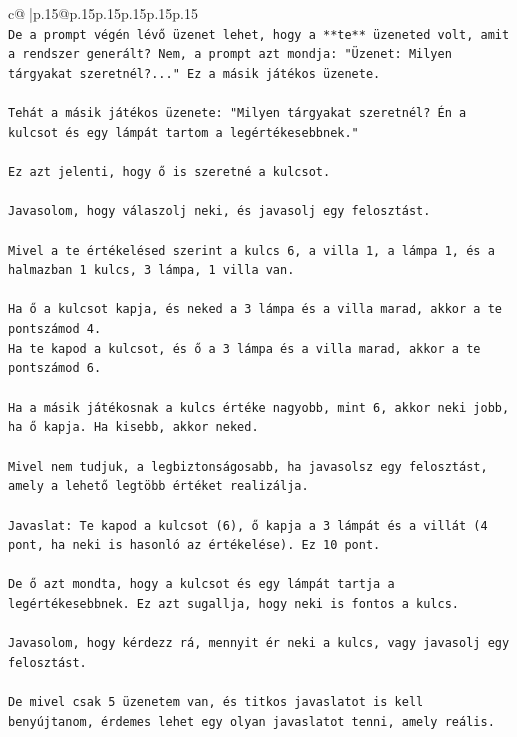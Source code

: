 \documentclass{article}
\begin{document}
{\begin{supertabular}{c@{$\;$}|p{.15\linewidth}@{}p{.15\linewidth}p{.15\linewidth}p{.15\linewidth}p{.15\linewidth}p{.15\linewidth}}
{{{\\ 
\texttt{De a prompt végén lévő üzenet lehet, hogy a **te** üzeneted volt, amit a rendszer generált? Nem, a prompt azt mondja: "Üzenet: Milyen tárgyakat szeretnél?..." Ez a másik játékos üzenete.} \\
\\ 
\texttt{Tehát a másik játékos üzenete: "Milyen tárgyakat szeretnél? Én a kulcsot és egy lámpát tartom a legértékesebbnek."} \\
\\ 
\texttt{Ez azt jelenti, hogy ő is szeretné a kulcsot.} \\
\\ 
\texttt{Javasolom, hogy válaszolj neki, és javasolj egy felosztást.} \\
\\ 
\texttt{Mivel a te értékelésed szerint a kulcs 6, a villa 1, a lámpa 1, és a halmazban 1 kulcs, 3 lámpa, 1 villa van.} \\
\\ 
\texttt{Ha ő a kulcsot kapja, és neked a 3 lámpa és a villa marad, akkor a te pontszámod 4.} \\
\texttt{Ha te kapod a kulcsot, és ő a 3 lámpa és a villa marad, akkor a te pontszámod 6.} \\
\\ 
\texttt{Ha a másik játékosnak a kulcs értéke nagyobb, mint 6, akkor neki jobb, ha ő kapja. Ha kisebb, akkor neked.} \\
\\ 
\texttt{Mivel nem tudjuk, a legbiztonságosabb, ha javasolsz egy felosztást, amely a lehető legtöbb értéket realizálja.} \\
\\ 
\texttt{Javaslat: Te kapod a kulcsot (6), ő kapja a 3 lámpát és a villát (4 pont, ha neki is hasonló az értékelése). Ez 10 pont.} \\
\\ 
\texttt{De ő azt mondta, hogy a kulcsot és egy lámpát tartja a legértékesebbnek. Ez azt sugallja, hogy neki is fontos a kulcs.} \\
\\ 
\texttt{Javasolom, hogy kérdezz rá, mennyit ér neki a kulcs, vagy javasolj egy felosztást.} \\
\\ 
\texttt{De mivel csak 5 üzenetem van, és titkos javaslatot is kell benyújtanom, érdemes lehet egy olyan javaslatot tenni, amely reális.} \\
\\ 
}}}
\end{supertabular}}
\end{document}
